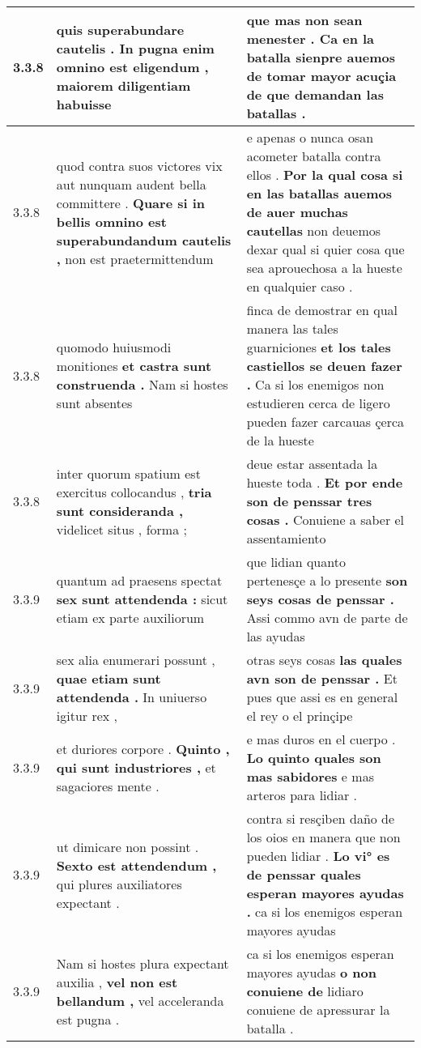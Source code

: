 \begin{tabular}{|p{1cm}|p{6.5cm}|p{6.5cm}|}
3.3.8 & quis superabundare cautelis . \textbf{ In pugna enim omnino est eligendum , } maiorem diligentiam habuisse & que mas non sean menester . \textbf{ Ca en la batalla sienpre auemos de tomar mayor acuçia } de que demandan las batallas . \\\hline
3.3.8 & quod contra suos victores vix aut nunquam audent bella committere . \textbf{ Quare si in bellis omnino est superabundandum cautelis , } non est praetermittendum & e apenas o nunca osan acometer batalla contra ellos . \textbf{ Por la qual cosa si en las batallas auemos de auer muchas cautellas } non deuemos dexar qual si quier cosa que sea aprouechosa a la hueste en qualquier caso . \\\hline
3.3.8 & quomodo huiusmodi monitiones \textbf{ et castra sunt construenda . } Nam si hostes sunt absentes & finca de demostrar en qual manera las tales guarniciones \textbf{ et los tales castiellos se deuen fazer . } Ca si los enemigos non estudieren cerca de ligero pueden fazer carcauas çerca de la hueste \\\hline
3.3.8 & inter quorum spatium est exercitus collocandus , \textbf{ tria sunt consideranda , } videlicet situs , forma ; & deue estar assentada la hueste toda . \textbf{ Et por ende son de penssar tres cosas . } Conuiene a saber el assentamiento \\\hline
3.3.9 & quantum ad praesens spectat \textbf{ sex sunt attendenda : } sicut etiam ex parte auxiliorum & que lidian quanto pertenesçe a lo presente \textbf{ son seys cosas de penssar . } Assi commo avn de parte de las ayudas \\\hline
3.3.9 & sex alia enumerari possunt , \textbf{ quae etiam sunt attendenda . } In uniuerso igitur rex , & otras seys cosas \textbf{ las quales avn son de penssar . } Et pues que assi es en general el rey o el prinçipe \\\hline
3.3.9 & et duriores corpore . \textbf{ Quinto , qui sunt industriores , } et sagaciores mente . & e mas duros en el cuerpo . \textbf{ Lo quinto quales son mas sabidores } e mas arteros para lidiar . \\\hline
3.3.9 & ut dimicare non possint . \textbf{ Sexto est attendendum , } qui plures auxiliatores expectant . & contra si resçiben daño de los oios en manera que non pueden lidiar . \textbf{ Lo vi° es de penssar quales esperan mayores ayudas . } ca si los enemigos esperan mayores ayudas \\\hline
3.3.9 & Nam si hostes plura expectant auxilia , \textbf{ vel non est bellandum , } vel acceleranda est pugna . & ca si los enemigos esperan mayores ayudas \textbf{ o non conuiene de } lidiaro conuiene de apressurar la batalla . \\\hline

\end{tabular}

